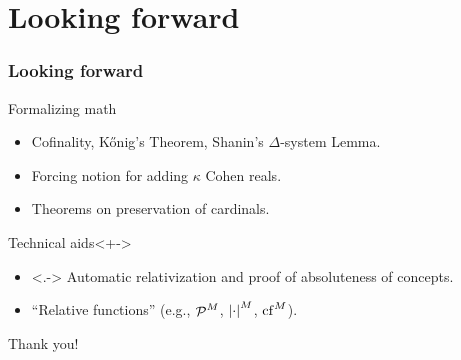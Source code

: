 \documentclass[english]{beamer}
\begin{document}

\section{Looking forward}

\begin{frame}
  \frametitle{Looking forward}
  \begin{block}{Formalizing math}
    \begin{itemize}
    \item<+-> Cofinality, K\H{o}nig's Theorem, Shanin's $\Delta$-system Lemma.
    \item<+-> Forcing notion for adding $\kappa$ Cohen reals.
    \item<+-> Theorems on preservation of cardinals.
    \end{itemize}
  \end{block}
  \begin{block}{Technical aids}<+->
    \begin{itemize}
    \item<.-> Automatic relativization and proof of absoluteness of concepts.
    \item<+-> ``Relative functions'' (e.g., $\P^M$, $\card{\cdot}^M$, $\cf^M$).
    \end{itemize}
  \end{block}
\end{frame}

\begin{frame}
  \begin{shadowblock}{}
    \begin{center}
      {\Huge Thank you!}
    \end{center}
  \end{shadowblock}
\end{frame}
\end{document}
